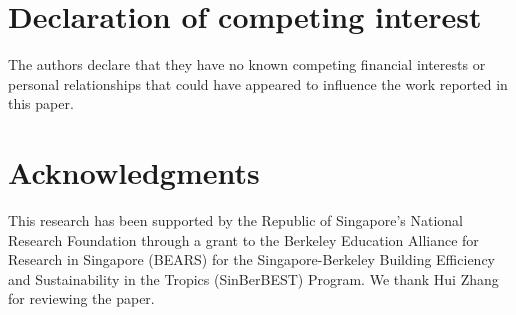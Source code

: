 \section{Declaration of competing interest} 
The authors declare that they have no known competing financial interests or personal relationships that could have appeared to influence the work reported in this paper.

\section{Acknowledgments}
This research has been supported by the Republic of Singapore’s National Research Foundation through a grant to the Berkeley Education Alliance for Research in Singapore (BEARS) for the Singapore-Berkeley Building Efficiency and Sustainability in the Tropics (SinBerBEST) Program.
We thank Hui Zhang for reviewing the paper.